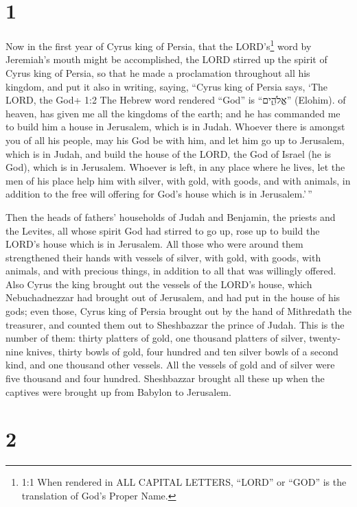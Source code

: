 \hypertarget{section}{%
\section{1}\label{section}}

 Now in the first year of Cyrus king of Persia, that the
LORD's\footnote{1:1 When rendered in ALL CAPITAL LETTERS, ``LORD'' or
  ``GOD'' is the translation of God's Proper Name.} word by Jeremiah's
mouth might be accomplished, the LORD stirred up the spirit of Cyrus
king of Persia, so that he made a proclamation throughout all his
kingdom, and put it also in writing, saying,  ``Cyrus king
of Persia says, `The LORD, the God+ 1:2 The Hebrew word rendered ``God''
is ``אֱלֹהִ֑ים'' (Elohim). of heaven, has given me all the kingdoms of
the earth; and he has commanded me to build him a house in Jerusalem,
which is in Judah.  Whoever there is amongst you of all his
people, may his God be with him, and let him go up to Jerusalem, which
is in Judah, and build the house of the LORD, the God of Israel (he is
God), which is in Jerusalem.  Whoever is left, in any place
where he lives, let the men of his place help him with silver, with
gold, with goods, and with animals, in addition to the free will
offering for God's house which is in Jerusalem.'\,''

 Then the heads of fathers' households of Judah and
Benjamin, the priests and the Levites, all whose spirit God had stirred
to go up, rose up to build the LORD's house which is in Jerusalem.
 All those who were around them strengthened their hands
with vessels of silver, with gold, with goods, with animals, and with
precious things, in addition to all that was willingly offered.
 Also Cyrus the king brought out the vessels of the LORD's
house, which Nebuchadnezzar had brought out of Jerusalem, and had put in
the house of his gods;  even those, Cyrus king of Persia
brought out by the hand of Mithredath the treasurer, and counted them
out to Sheshbazzar the prince of Judah.  This is the number
of them: thirty platters of gold, one thousand platters of silver,
twenty-nine knives,  thirty bowls of gold, four hundred and
ten silver bowls of a second kind, and one thousand other vessels.
 All the vessels of gold and of silver were five thousand
and four hundred. Sheshbazzar brought all these up when the captives
were brought up from Babylon to Jerusalem.

\hypertarget{section-1}{%
\section{2}\label{section-1}}

